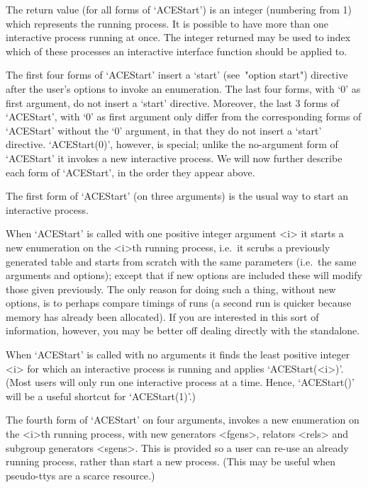The  return  value  (for  all  forms  of  `ACEStart')  is  an  integer
(numbering from  1)  which  represents  the  running  process.  It  is
possible to have more than one interactive process  running  at  once.
The integer returned may be used to index which of these processes  an
interactive {\ACE} interface function should be applied to.

The first four forms  of  `ACEStart'  insert  a  `start'  (see~"option
start") directive after the user's options to invoke  an  enumeration.
The last four forms, with `0' as  first  argument,  do  not  insert  a
`start' directive. Moreover, the last 3 forms of `ACEStart', with  `0'
as  first  argument  only  differ  from  the  corresponding  forms  of
`ACEStart' without the `0' argument, in that  they  do  not  insert  a
`start' directive. `ACEStart(0)',  however,  is  special;  unlike  the
no-argument form of `ACEStart' it invokes  a  new  interactive  {\ACE}
process. We will now further describe each form of `ACEStart', in  the
order they appear above.

The first form of `ACEStart' (on three arguments) is the usual way  to
start an interactive {\ACE} process.

When `ACEStart' is called with one positive integer  argument  <i>  it
starts a new enumeration on the <i>th running process, i.e.~it  scrubs
a previously generated table and starts from  scratch  with  the  same
parameters (i.e.~the same arguments and options); except that  if  new
options are included these will modify  those  given  previously.  The
only reason for doing such a thing, without new options, is to perhaps
compare timings of runs (a second run is quicker  because  memory  has
already been allocated).  If  you  are  interested  in  this  sort  of
information, however, you may be better off dealing directly with  the
standalone.

When `ACEStart' is  called  with  no  arguments  it  finds  the  least
positive integer <i> for which an interactive process is  running  and
applies `ACEStart(<i>)'. (Most users will  only  run  one  interactive
process at a time. Hence, `ACEStart()' will be a useful  shortcut  for
`ACEStart(1)'.)

The fourth form  of  `ACEStart'  on  four  arguments,  invokes  a  new
enumeration on the <i>th running process, with new generators <fgens>,
relators <rels> and subgroup generators <sgens>. This is provided so a
user can re-use an already running process, rather than  start  a  new
process. (This may be useful when pseudo-ttys are a scarce resource.)

